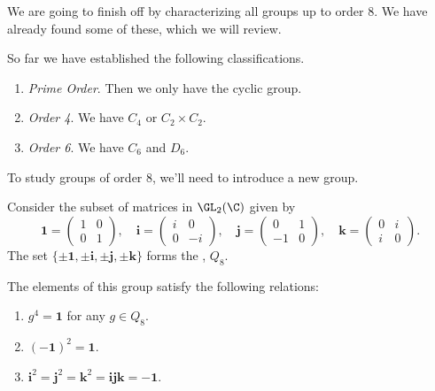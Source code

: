 
We are going to finish off by characterizing all groups up to order 8. We have already found some of these, which we will review.


So far we have established the following classifications.

\begin{enumerate}
	\item \emph{Prime Order}. Then we only have the cyclic group.
	\item \emph{Order 4}. We have $C_4$ or $C_2 \times C_2$.
	\item \emph{Order 6}. We have $C_6$ and $D_6$.
\end{enumerate}


To study groups of order 8, we'll need to introduce a new group.

\begin{definition}[Quaternions]
	Consider the subset of matrices in $\GL_2(\C)$ given by
	$$
	\mathbf{1} = \begin{pmatrix}
		1 & 0 \\ 0 & 1
	\end{pmatrix}, \quad  \mathbf{i} = \begin{pmatrix}
		i & 0 \\ 0 & -i
	\end{pmatrix}, \quad \mathbf{j} = \begin{pmatrix}
		0 & 1 \\ -1 & 0
	\end{pmatrix}, \quad \mathbf{k} = \begin{pmatrix}
		0 & i \\ i & 0
	\end{pmatrix}.
	$$
	The set $\{\pm\mathbf{1}, \pm\mathbf{i}, \pm\mathbf{j}, \pm\mathbf{k}\}$ forms the , $Q_8$.
\end{definition}

The elements of this group satisfy the following relations:
\begin{enumerate}[label=(\roman*)]
	\item $g^4= \mathbf{1}$ for any $g \in Q_8$.
	\item $(-\mathbf{1})^2 = \mathbf{1}$.
	\item $\mathbf{i}^2 = \mathbf{j}^2 = \mathbf{k}^2 = \mathbf{ijk} = -\mathbf{1}$.
\end{enumerate}

